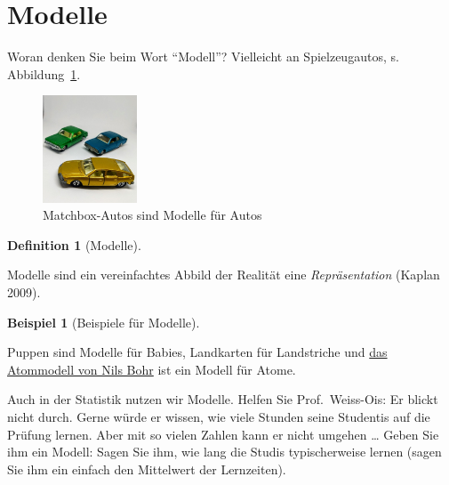 \documentclass[
  a4paper,
  DIV=11]{scrreprt}
\theoremstyle{definition}
\newtheorem{definition}{Definition}[chapter]
\theoremstyle{definition}
\newtheorem{example}{Beispiel}[chapter]
\theoremstyle{remark}
\begin{document}
\hypertarget{modelle}{%
\section{Modelle}\label{modelle}}

Woran denken Sie beim Wort ``Modell''? Vielleicht an Spielzeugautos, s.
Abbildung~\ref{fig-matchbox}.

\begin{figure}

{\centering \includegraphics[width=0.25\textwidth,height=\textheight]{./img/matchbox.jpg}

}

\caption{\label{fig-matchbox}Matchbox-Autos sind Modelle für Autos}

\end{figure}

\leavevmode{}%
\begin{definition}[Modelle]\label{def-modelle}

Modelle sind ein vereinfachtes Abbild der Realität eine
\emph{Repräsentation} (Kaplan 2009).

\end{definition}

\leavevmode{}%
\begin{example}[Beispiele für Modelle]\label{exm-Modelle}

Puppen sind Modelle für Babies, Landkarten für Landstriche und
\href{https://de.wikipedia.org/wiki/Bohrsches_Atommodell}{das Atommodell
von Nils Bohr} ist ein Modell für Atome.

\end{example}

Auch in der Statistik nutzen wir Modelle. Helfen Sie Prof.~Weiss-Ois: Er
blickt nicht durch. Gerne würde er wissen, wie viele Stunden seine
Studentis auf die Prüfung lernen. Aber mit so vielen Zahlen kann er
nicht umgehen \ldots{} Geben Sie ihm ein Modell: Sagen Sie ihm, wie lang
die Studis typischerweise lernen (sagen Sie ihm ein einfach den
Mittelwert der Lernzeiten).
\end{document}
